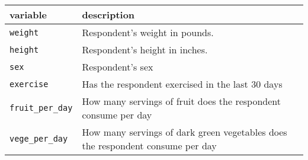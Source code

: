 \documentclass[
]{article}
\begin{document}
\begin{longtable}[]{@{}ll@{}}
\toprule
\begin{minipage}[b]{0.25\columnwidth}\raggedright
variable\strut
\end{minipage} & \begin{minipage}[b]{0.69\columnwidth}\raggedright
description\strut
\end{minipage}\tabularnewline
\midrule
\endhead
\begin{minipage}[t]{0.25\columnwidth}\raggedright
\texttt{weight}\strut
\end{minipage} & \begin{minipage}[t]{0.69\columnwidth}\raggedright
Respondent's weight in pounds.\strut
\end{minipage}\tabularnewline
\begin{minipage}[t]{0.25\columnwidth}\raggedright
\texttt{height}\strut
\end{minipage} & \begin{minipage}[t]{0.69\columnwidth}\raggedright
Respondent's height in inches.\strut
\end{minipage}\tabularnewline
\begin{minipage}[t]{0.25\columnwidth}\raggedright
\texttt{sex}\strut
\end{minipage} & \begin{minipage}[t]{0.69\columnwidth}\raggedright
Respondent's sex\strut
\end{minipage}\tabularnewline
\begin{minipage}[t]{0.25\columnwidth}\raggedright
\texttt{exercise}\strut
\end{minipage} & \begin{minipage}[t]{0.69\columnwidth}\raggedright
Has the respondent exercised in the last 30 days\strut
\end{minipage}\tabularnewline
\begin{minipage}[t]{0.25\columnwidth}\raggedright
\texttt{fruit\_per\_day}\strut
\end{minipage} & \begin{minipage}[t]{0.69\columnwidth}\raggedright
How many servings of fruit does the respondent consume per day\strut
\end{minipage}\tabularnewline
\begin{minipage}[t]{0.25\columnwidth}\raggedright
\texttt{vege\_per\_day}\strut
\end{minipage} & \begin{minipage}[t]{0.69\columnwidth}\raggedright
How many servings of dark green vegetables does the respondent consume
per day\strut
\end{minipage}\tabularnewline
\bottomrule
\end{longtable}
\end{document}
